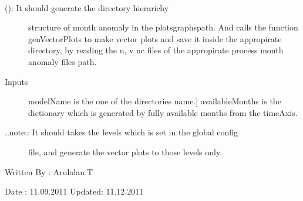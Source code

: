 \documentclass[letterpaper,10pt,english]{sphinxmanual}
\begin{document}

\begin{fulllineitems}
\label{diagnosis:generate_winds_plots.genMonthAnomalyDirs}~\begin{description}
\item[{{\hyperref[diagnosis:generate_winds_plots.genMonthAnomalyDirs]{}} (): It should generate the directory hierarichy}] \leavevmode
structure of month anomaly in the plotsgraphspath. And calls the
function genVectorPlots to make vector plots and save it inside the
appropirate directory, by reading the u, v nc files of the appropirate
process month anomaly files path.

\item[{Inputs}] \leavevmode{[}modelName is the one of the directories name.{]}
availableMonths is the dictionary which is generated by fully
available months from the timeAxis.

\item[{..note:: It should takes the levels which is set in the global config}] \leavevmode
file, and generate the vector plots to those levels only.

\end{description}

Written By : Arulalan.T

Date : 11.09.2011
Updated: 11.12.2011

\end{fulllineitems}

\end{document}
